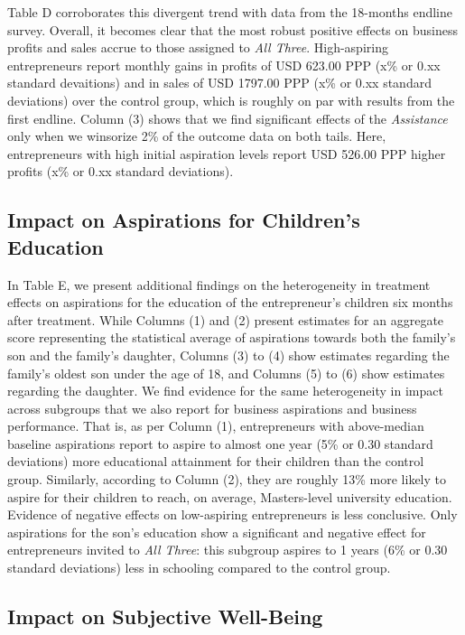 \documentclass[11.5pt]{article}
\begin{document}
Table D corroborates this divergent trend with data from the 18-months endline survey. Overall, it becomes clear that the most robust positive effects on business profits and sales accrue to those assigned to \emph{All Three}. High-aspiring entrepreneurs report monthly gains in profits of USD 623.00 PPP (x\% or 0.xx standard devaitions) and in sales of USD 1797.00 PPP (x\% or 0.xx standard deviations) over the control group, which is roughly on par with results from the first endline. Column (3) shows that we find significant effects of the \emph{Assistance} only when we winsorize 2\% of the outcome data on both tails. Here, entrepreneurs with high initial aspiration levels report USD 526.00 PPP higher profits (x\% or 0.xx standard deviations).

\subsection{Impact on Aspirations for Children's Education}

In Table E, we present additional findings on the heterogeneity in treatment effects on aspirations for the education of the entrepreneur's children six months after treatment. While Columns (1) and (2) present estimates for an aggregate score representing the statistical average of aspirations towards both the family's son and the family's daughter, Columns (3) to (4) show estimates regarding the family's oldest son under the age of 18, and Columns (5) to (6) show estimates regarding the daughter. We find evidence for the same heterogeneity in impact across subgroups that we also report for business aspirations and business performance. That is, as per Column (1), entrepreneurs with above-median baseline aspirations report to aspire to almost one year (5\% or 0.30 standard deviations) more educational attainment for their children than the control group. Similarly, according to Column (2), they are roughly 13\% more likely to aspire for their children to reach, on average, Masters-level university education. Evidence of negative effects on low-aspiring entrepreneurs is less conclusive. Only aspirations for the son's education show a significant and negative effect for entrepreneurs invited to \emph{All Three}: this subgroup aspires to 1 years (6\% or 0.30 standard deviations) less in schooling compared to the control group.

\subsection{Impact on Subjective Well-Being}
\end{document}
